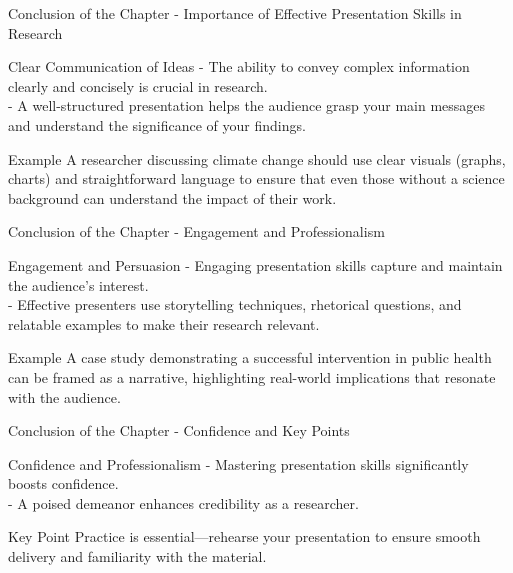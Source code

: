 \documentclass[aspectratio=169]{beamer}
\begin{document}
\begin{frame}[fragile]{Conclusion of the Chapter - Importance of Effective Presentation Skills in Research}
    \begin{block}{Clear Communication of Ideas}
        - The ability to convey complex information clearly and concisely is crucial in research. \\
        - A well-structured presentation helps the audience grasp your main messages and understand the significance of your findings.
    \end{block}
    \begin{exampleblock}{Example}
        A researcher discussing climate change should use clear visuals (graphs, charts) and straightforward language to ensure that even those without a science background can understand the impact of their work.
    \end{exampleblock}
\end{frame}

\begin{frame}[fragile]{Conclusion of the Chapter - Engagement and Professionalism}
    \begin{block}{Engagement and Persuasion}
        - Engaging presentation skills capture and maintain the audience's interest. \\
        - Effective presenters use storytelling techniques, rhetorical questions, and relatable examples to make their research relevant.
    \end{block}
    \begin{exampleblock}{Example}
        A case study demonstrating a successful intervention in public health can be framed as a narrative, highlighting real-world implications that resonate with the audience.
    \end{exampleblock}
\end{frame}

\begin{frame}[fragile]{Conclusion of the Chapter - Confidence and Key Points}
    \begin{block}{Confidence and Professionalism}
        - Mastering presentation skills significantly boosts confidence. \\
        - A poised demeanor enhances credibility as a researcher.
    \end{block}
    \begin{block}{Key Point}
        Practice is essential—rehearse your presentation to ensure smooth delivery and familiarity with the material.
    \end{block}
\end{frame}
\end{document}
